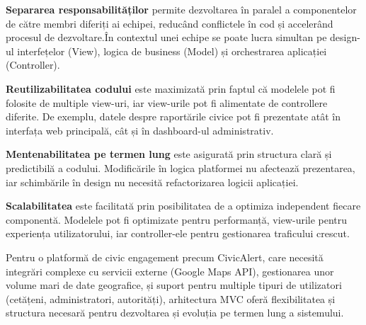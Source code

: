 \documentclass[12pt,a4paper]{report}
\begin{document}
\textbf{Separarea responsabilităților} permite dezvoltarea în paralel a componentelor de către membri diferiți ai echipei, reducând conflictele în cod și accelerând procesul de dezvoltare.În contextul unei echipe se  poate lucra simultan pe design-ul interfețelor (View), logica de business (Model) și orchestrarea aplicației (Controller).

\textbf{Reutilizabilitatea codului} este maximizată prin faptul că modelele pot fi folosite de multiple view-uri, iar view-urile pot fi alimentate de controllere diferite. De exemplu, datele despre raportările civice pot fi prezentate atât în interfața web principală, cât și în dashboard-ul administrativ.

\textbf{Mentenabilitatea pe termen lung} este asigurată prin structura clară și predictibilă a codului. Modificările în logica platformei nu afectează prezentarea, iar schimbările în design nu necesită refactorizarea logicii aplicației.

\textbf{Scalabilitatea} este facilitată prin posibilitatea de a optimiza independent fiecare componentă. Modelele pot fi optimizate pentru performanță, view-urile pentru experiența utilizatorului, iar controller-ele pentru gestionarea traficului crescut.

Pentru o platformă de civic engagement precum CivicAlert, care necesită integrări complexe cu servicii externe (Google Maps API), gestionarea unor volume mari de date geografice, și suport pentru multiple tipuri de utilizatori (cetățeni, administratori, autorități), arhitectura MVC oferă flexibilitatea și structura necesară pentru dezvoltarea și evoluția pe termen lung a sistemului.
\end{document}
